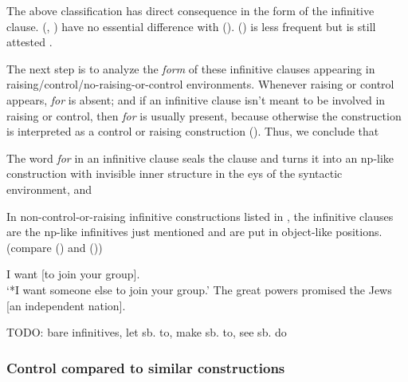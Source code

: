 \documentclass[UTF8, a4paper, oneside, scheme=plain, 12pt]{ctexbook}
\newcommand*{\citepage}[1]{p.~{#1}}
\newcommand{\form}[1]{\emph{#1}}
\newcommand{\translate}[1]{`#1'}
\begin{document}
The above classification has direct consequence in the form of the infinitive clause.
(,
)
have no essential difference with ().
() is less frequent 
but is still attested \citep[\citepage{243}]{dixon2005semantic}.

The next step is to analyze the \emph{form} of these infinitive clauses
appearing in raising/control/no-raising-or-control environments.
Whenever raising or control appears, \form{for} is absent;
and if an infinitive clause isn't meant to be involved in raising or control,
then \form{for} is usually present,
because otherwise the construction 
is interpreted as a control or raising construction 
().
Thus, we conclude that \begin{enumerate*}
    \item The word \form{for} in an infinitive clause seals the clause 
    and turns it into an \acs{np}-like construction 
    with invisible inner structure in the eys of the syntactic environment, and 
    \item In non-control-or-raising infinitive constructions listed 
    in ,
    the infinitive clauses are the \acs{np}-like infinitives just mentioned  
    and are put in object-like positions.
    (compare () and 
    ())
\end{enumerate*}

\begin{exe}
    \ex\label{ex:complement.infinitive.preference-control-reading} I want [to join your group]. \\
    \translate{*I want someone else to join your group.}
    \ex\label{ex:complement.infinitive.promise-np-object} The great powers promised the Jews [an independent nation].
\end{exe}

TODO: bare infinitives, let sb. to, make sb. to, see sb. do \citet[\citepage{1236},\citepage{1254}]{cgel}

\subsubsection{Control compared to similar constructions}\label{sec:complement.infinitive.control}
\end{document}

